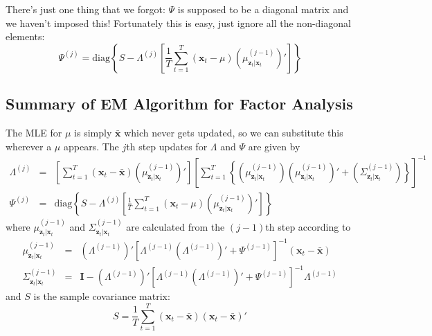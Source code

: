 There's just one thing that we forgot: $\Psi$ is supposed to be a diagonal matrix and we haven't imposed this! Fortunately this is easy, just ignore all the non-diagonal elements:
$$\Psi^{(j)} = \mbox{diag}\left\{S - \Lambda^{(j)}\left[\frac{1}{T} \sum_{t=1}^T (\mathbf{x}_t - \mu)\left(\mu^{(j-1)}_{\mathbf{z}_t|\mathbf{x}_t}\right)'\right] \right\}$$

\subsection{Summary of EM Algorithm for Factor Analysis}
The MLE for $\mu$ is simply $\bar{\mathbf{x}}$ which never gets updated, so we can substitute this wherever a $\mu$ appears. The $j$th step updates for $\Lambda$ and $\Psi$ are given by
\begin{eqnarray*}
	\Lambda^{(j)} &=& \left[\sum_{t=1}^T (\mathbf{x}_t - \bar{\mathbf{x}})\left(\mu^{(j-1)}_{\mathbf{z}_t|\mathbf{x}_t} \right)'\right]\left[\sum_{t=1}^T \left\{ \left(\mu^{(j-1)}_{\mathbf{z}_t|\mathbf{x}_t} \right)\left(\mu^{(j-1)}_{\mathbf{z}_t|\mathbf{x}_t} \right)' + \left(\Sigma^{(j-1)}_{\mathbf{z}_t|\mathbf{x}_t} \right) \right\}  \right]^{-1} \\
	\Psi^{(j)} &=& \mbox{diag}\left\{S - \Lambda^{(j)}\left[\frac{1}{T} \sum_{t=1}^T (\mathbf{x}_t - \mu)\left(\mu^{(j-1)}_{\mathbf{z}_t|\mathbf{x}_t}\right)'\right] \right\}
\end{eqnarray*}
where $\mu^{(j-1)}_{\mathbf{z}_t|\mathbf{x}_t}$ and $\Sigma^{(j-1)}_{\mathbf{z}_t|\mathbf{x}_t}$ are calculated from the $(j-1)$th step according to
	\begin{eqnarray*}
		\mu^{(j-1)}_{\mathbf{z}_t|\mathbf{x}_t} &=& \left(\Lambda^{(j-1)}\right)' \left[\Lambda^{(j-1)} \left(\Lambda^{(j-1)}\right)' + \Psi^{(j-1)}\right]^{-1} \left(\mathbf{x}_t - \bar{\mathbf{x}}\right) \\
		\Sigma^{(j-1)}_{\mathbf{z}_t|\mathbf{x}_t}  &=& \mathbf{I} - \left(\Lambda^{(j-1)}\right)' \left[\Lambda^{(j-1)} \left(\Lambda^{(j-1)}\right)' + \Psi^{(j-1)}\right]^{-1}\Lambda^{(j-1)}
	\end{eqnarray*}
and $S$ is the sample covariance matrix:
	$$S = \frac{1}{T} \sum_{t=1}^T (\mathbf{x}_t - \bar{\mathbf{x}})(\mathbf{x}_t - \bar{\mathbf{x}})'$$
